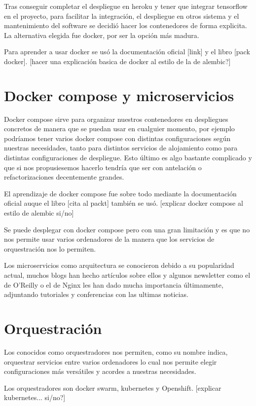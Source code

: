 Tras conseguir completar el despliegue en heroku y tener que integrar tensorflow en el proyecto, para facilitar la integración, el despliegue en otros sistema y el mantenimiento del software se decidió hacer los contenedores de forma explicita. La alternativa elegida fue docker, por ser la opción más madura. 

Para aprender a usar docker se usó la documentación oficial [link] y el libro [pack docker]. [hacer una explicación basica de docker al estilo de la de alembic?]

\section{Docker compose y microservicios}

Docker compose sirve para organizar nuestros contenedores en despliegues concretos de manera que se puedan usar en cualguier momento, por ejemplo podríamos tener varios docker compose con distintas configuraciones según nuestras necesidades, tanto para distintos servicios de alojamiento como para distintas configuraciones de despliegue. Esto último es algo bastante complicado y que si nos propusiesemos hacerlo tendría que ser con antelación o refactorizaciones decentemente grandes.

El aprendizaje de docker compose fue sobre todo mediante la documentación oficial auque el libro [cita al packt] también se usó. [explicar docker compose al estilo de alembic si/no] 

Se puede desplegar con docker compose pero con una gran limitación y es que no nos permite usar varios ordenadores de la manera que los servicios de orquestración nos lo permiten.

Los microservicios como arquitectura se conocieron debido a su popularidad actual, muchos blogs han hecho artículos sobre ellos y algunos newsletter como el de O'Reilly o el de Nginx les han dado mucha importancia últimamente, adjuntando tutoriales y conferencias con las ultimas noticias.


\section{Orquestración}

Los conocidos como orquestradores nos permiten, como su nombre indica, orquestrar servicios entre varios ordenadores lo cual nos permite elegir configuraciones más versátiles y acordes a nuestras necesidades. 

Los orquestradores son docker swarm, kubernetes y Openshift. [explicar kubernetes... si/no?]

